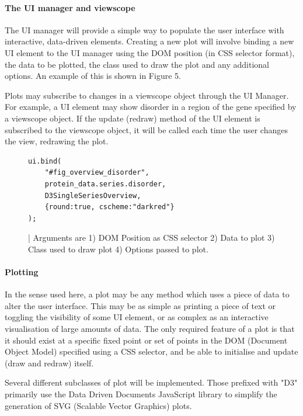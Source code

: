 \documentclass[fleqn,10pt]{article} %
\begin{document}
\paragraph{The UI manager and viewscope}

The UI manager will provide a simple way to populate the user interface with interactive, data-driven elements. Creating a new plot will involve binding a new UI element to the UI manager using the DOM position (in CSS selector format), the data to be plotted, the class used to draw the plot and any additional options. An example of this is shown in Figure 5.

Plots may subscribe to changes in a viewscope object through the UI Manager. For example, a UI element may show disorder in a region of the gene specified by a viewscope object. If the update (redraw) method of the UI element is subscribed to the viewscope object, it will be called each time the user changes the view, redrawing the plot.

\begin{figure}
\begin{lstlisting}
ui.bind(
	"#fig_overview_disorder", 
	protein_data.series.disorder,
	D3SingleSeriesOverview, 
	{round:true, cscheme:"darkred"} 
);
\end{lstlisting}
\caption{ | Arguments are 1) DOM Position as CSS selector 2) Data to plot 3) Class used to draw plot 4) Options passed to plot.}
\end{figure}

\paragraph{Plotting}

In the sense used here, a plot may be any method which uses a piece of data to alter the user interface. This may be as simple as printing a piece of text or toggling the visibility of some UI element, or as complex as an interactive visualisation of large amounts of data. The only required feature of a plot is that it should exist at a specific fixed point or set of points in the DOM (Document Object Model) specified using a CSS selector, and be able to initialise and update (draw and redraw) itself.

Several different subclasses of plot will be implemented. Those prefixed with "D3" primarily use the Data Driven Documents JavaScript library to simplify the generation of SVG (Scalable Vector Graphics) plots.
\end{document}
